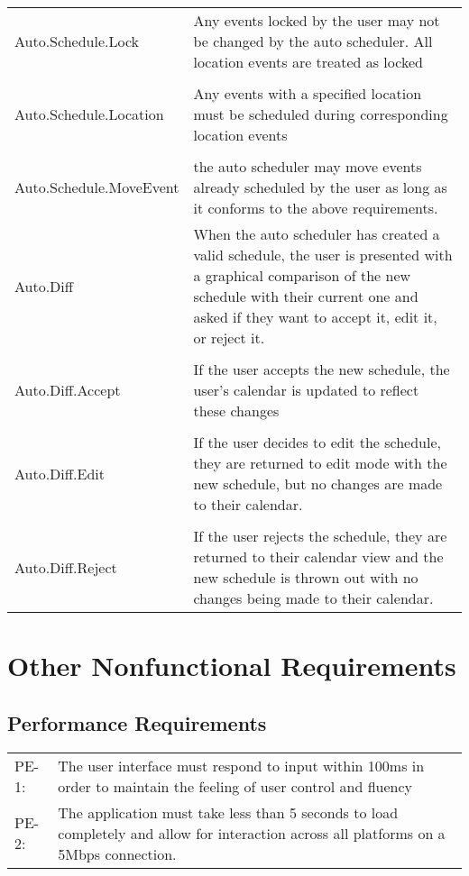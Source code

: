 \documentclass{scrreprt}
\begin{document}
\begin{center}
\begin{longtable}{ | p{6cm} | p{9cm} | }
Auto.Schedule.Lock & Any events locked by the user may not be changed by the
auto scheduler.  All location events are treated as locked\\
& \\
Auto.Schedule.Location & Any events with a specified location must be scheduled
during corresponding location events\\
& \\
Auto.Schedule.MoveEvent & the auto scheduler may move events already scheduled by
the user as long as it conforms to the above requirements.\\
\hline
Auto.Diff & When the auto scheduler has created a valid schedule, the user is
presented with a graphical comparison of the new schedule with their current one
and asked if they want to accept it, edit it, or reject it.\\
& \\
Auto.Diff.Accept & If the user accepts the new schedule, the user's calendar is
updated to reflect these changes\\
& \\
Auto.Diff.Edit & If the user decides to edit the schedule, they are returned to
edit mode with the new schedule, but no changes are made to their calendar.\\
& \\
Auto.Diff.Reject & If the user rejects the schedule, they are returned to their
calendar view and the new schedule is thrown out with no changes being made to
their calendar.\\
\hline
\end{longtable}
\end{center}

\chapter{Other Nonfunctional Requirements}

\section{Performance Requirements}
\begin{center}
\begin{tabular}{ p{1.5cm} p{13cm} }
PE-1: & The user interface must respond to input within 100ms in order to maintain
the feeling of user control and fluency\\
PE-2: & The application must take less than 5 seconds to load completely and allow
for interaction across all platforms on a 5Mbps connection.
\end{tabular}
\end{center}
\end{document}
